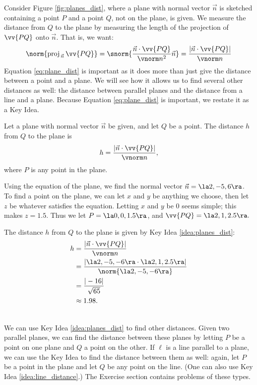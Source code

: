 Consider Figure \ref{fig:planes_dist}, where a plane with normal vector $\vec n$ is sketched containing a point $P$ and a point $Q$, not on the plane, is given. We measure the distance from $Q$ to the plane by measuring the length of the projection of $\vv{PQ}$ onto $\vec n$. That is, we want:
\begin{equation}\norm{\text{proj}_{\,\vec n}\,{\vv{PQ}}} = \snorm{\frac{\vec n\cdot \vv{PQ}}{\vnorm n^2}\vec n} = \frac{|\vec n\cdot \vv{PQ}|}{\vnorm n}\label{eq:plane_dist}
\end{equation}
Equation \eqref{eq:plane_dist} is important as it does more than just give the distance between a point and a plane. We will see how it allows us to find several other distances as well: the distance between parallel planes and the distance from a line and a plane. Because Equation \eqref{eq:plane_dist} is important, we restate it as a Key Idea.

{Let a plane with normal vector $\vec n$ be given, and let $Q$ be a point. The distance $h$ from $Q$ to the plane is 
$$h = \frac{|\vec n\cdot \vv{PQ}|}{\vnorm n},$$
where $P$ is any point in the plane.
}

{Using the equation of the plane, we find the normal vector $\vec n = \la 2,-5,6\ra$. To find a point on the plane, we can let $x$ and $y$ be anything we choose, then let $z$ be whatever satisfies the equation. Letting $x$ and $y$ be 0 seems simple; this makes $z = 1.5$. Thus we let $P = \la 0,0,1.5\ra$, and $\vv{PQ} = \la 2,1,2.5\ra.$

The distance $h$ from $Q$ to the plane is given by Key Idea \ref{idea:planes_dist}:
\begin{align*}
h &= \frac{|\vec n\cdot \vv{PQ}|}{\vnorm n} \\
  &= \frac{|\la 2,-5,-6\ra \cdot \la 2,1,2.5\ra|}{\norm{\la 2,-5,-6\ra}} \\
	&= \frac{ |-16|}{\sqrt{65}} \\
	&\approx 1.98.
\end{align*}
\baselineskip
}\\

We can use Key Idea \ref{idea:planes_dist} to find other distances. Given two parallel planes, we can find the distance between these planes by letting $P$ be a point on one plane and $Q$ a point on the other. If $\ell$ is a line parallel to a plane, we can use the Key Idea to find the distance between them as well: again, let $P$ be a point in the plane and let $Q$ be any point on the line. (One can also use Key Idea \ref{idea:line_distance}.) The Exercise section contains problems of these types.\\

